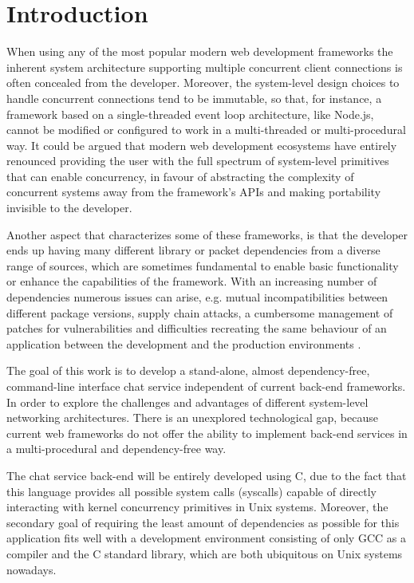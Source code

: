 \section{Introduction}
When using any of the most popular modern web development frameworks the inherent system architecture supporting multiple concurrent client connections is often concealed from the developer. Moreover, the system-level design choices to handle concurrent connections tend to be immutable, so that, for instance, a framework based on a single-threaded event loop architecture, like Node.js, cannot be modified or configured to work in a multi-threaded or multi-procedural way. It could be argued that modern web development ecosystems have entirely renounced providing the user with the full spectrum of system-level primitives that can enable concurrency, in favour of abstracting the complexity of concurrent systems away from the framework's APIs and making portability invisible to the developer.

Another aspect that characterizes some of these frameworks, is that the developer ends up having many different library or packet dependencies from a diverse range of sources, which are sometimes fundamental to enable basic functionality or enhance the capabilities of the framework. With an increasing number of dependencies numerous issues can arise, e.g. mutual incompatibilities between different package versions, supply chain attacks, a cumbersome management of patches for vulnerabilities and difficulties recreating the same behaviour of an application between the development and the production environments \cite{2012PoulHenning}. 

The goal of this work is to develop a stand-alone, almost dependency-free, command-line interface chat service independent of current back-end frameworks. In order to explore the challenges and advantages of different system-level networking architectures. There is an unexplored technological gap, because current web frameworks do not offer the ability to implement back-end services in a multi-procedural and dependency-free way. 

The chat service back-end will be entirely developed using C, due to the fact that this language provides all possible system calls (syscalls) capable of directly interacting with kernel concurrency primitives in Unix systems. Moreover, the secondary goal of requiring the least amount of dependencies as possible for this application fits well with a development environment consisting of only GCC as a compiler and the C standard library, which are both ubiquitous on Unix systems nowadays. 

